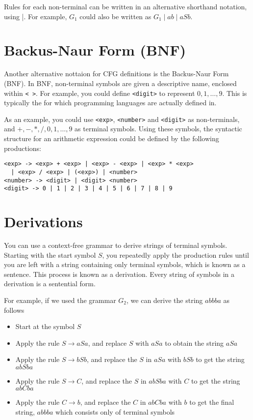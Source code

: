 Rules for each non-terminal can be written in an alternative shorthand notation, using |. For example, $G_1$ could also
 be written as $G_1 \mid ab \mid aSb$.

\section*{Backus-Naur Form (BNF)}

Another alternative nottaion for CFG definitions is the Backus-Naur Form (BNF). In BNF, non-terminal symbols are given a
 descriptive name, enclosed within \verb`< >`. For example, you could define \verb`<digit>` to represent $0, 1, \dots, 9$.
 This is typically the for which programming languages are actually defined in.

As an example, you could use \verb`<exp>`, \verb`<number>` and \verb`<digit>` as non-terminals, and $+, -, *, /, 0, 1, \dots, 9$
 as terminal symbols. Using these symbols, the syntactic structure for an arithmetic expression could be defined by the
 following productions:
\begin{verbatim}
<exp> -> <exp> + <exp> | <exp> - <exp> | <exp> * <exp>
  | <exp> / <exp> | (<exp>) | <number>
<number> -> <digit> | <digit> <number>
<digit> -> 0 | 1 | 2 | 3 | 4 | 5 | 6 | 7 | 8 | 9
\end{verbatim}

\section*{Derivations}

You can use a context-free grammar to derive strings of terminal symbols. Starting with the start symbol $S$, you
 repeatedly apply the production rules until you are left with a string containing only terminal symbols, which is known
 as a sentence. This process is known as a derivation. Every string of symbols in a derivation is a sentential form.

For example, if we used the grammar $G_2$, we can derive the string $abbba$ as follows
\begin{itemize}
  \item Start at the symbol $S$
  \item Apply the rule $S \rightarrow aSa$, and replace $S$ with $aSa$ to obtain the string $aSa$
  \item Apply the rule $S \rightarrow bSb$, and replace the $S$ in $aSa$ with $bSb$ to get the string $abSba$
  \item Apply the rule $S \rightarrow C$, and replace the $S$ in $abSba$ with $C$ to get the string $abCba$
  \item Apply the rule $C \rightarrow b$, and replace the $C$ in $abCba$ with $b$ to get the final string, $abbba$ which
   consists only of terminal symbols
\end{itemize}

